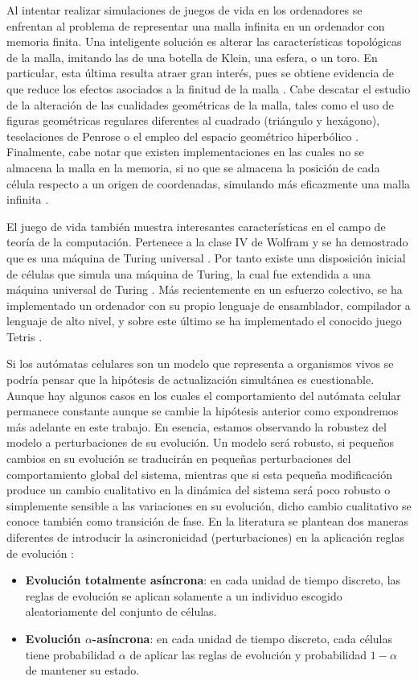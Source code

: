 \documentclass[../proyecto.tex]{book}
\begin{document}
Al intentar realizar simulaciones de juegos de vida en los ordenadores se enfrentan al problema de representar una malla infinita en un ordenador con memoria finita. Una inteligente solución es alterar las características topológicas de la malla, imitando las de una botella de Klein, una esfera, o un toro. En particular, esta última resulta atraer gran interés, pues se obtiene evidencia de que reduce los efectos asociados a la finitud de la malla \cite{finitudMalla, finitudMalla2}. Cabe descatar el estudio de la alteración de las cualidades geométricas de la malla, tales como el uso de figuras geométricas regulares diferentes al cuadrado (triángulo y hexágono)\cite{triangular}, teselaciones de Penrose \cite{penrose} o el empleo del espacio geométrico hiperbólico \cite{hiperbolico}. Finalmente, cabe notar que existen implementaciones en las cuales no se almacena la malla en la memoria, si no que se almacena la posición de cada célula respecto a un origen de coordenadas, simulando más eficazmente una malla infinita \cite{boardless}.

El juego de vida también muestra interesantes características en el campo de teoría de la computación. Pertenece a la clase IV de Wolfram \cite{ccuatro, ccuatro2} y se ha demostrado que es una máquina de Turing universal \cite{turingUniversal}. Por tanto existe una disposición inicial de células que simula una máquina de Turing, la cual fue extendida a una máquina universal de Turing \cite{turing}. Más recientemente en un esfuerzo colectivo, se ha implementado un ordenador con su propio lenguaje de ensamblador, compilador a lenguaje de alto nivel, y sobre este último se ha implementado el conocido juego Tetris \cite{tetris, logical}.

Si los autómatas celulares son un modelo que representa a organismos vivos se podría pensar que la hipótesis de actualización simultánea es cuestionable. Aunque hay algunos casos en los cuales el comportamiento del autómata celular permanece constante aunque se cambie la hipótesis anterior como expondremos más adelante en este trabajo. En esencia, estamos observando la robustez del modelo a perturbaciones de su evolución. Un modelo será robusto, si pequeños cambios en su evolución se traducirán en pequeñas perturbaciones del comportamiento global del sistema, mientras que si esta pequeña modificación produce un cambio cualitativo en la dinámica del sistema será poco robusto o simplemente sensible a las variaciones en su evolución, dicho cambio cualitativo se conoce también como transición de fase. En la literatura se plantean dos maneras diferentes de introducir la asincronicidad (perturbaciones) en la aplicación reglas de evolución \cite{asyncIntro}:
\begin{itemize}
	\item \textbf{Evolución totalmente asíncrona}: en cada unidad de tiempo discreto, las reglas de evolución se aplican solamente a un individuo escogido aleatoriamente del conjunto de células.
	\item \textbf{Evolución $\alpha$-asíncrona}: en cada unidad de tiempo discreto, cada células tiene probabilidad $\alpha$ de aplicar las reglas de evolución y probabilidad $1-\alpha$ de mantener su estado.
\end{itemize}
\end{document}
